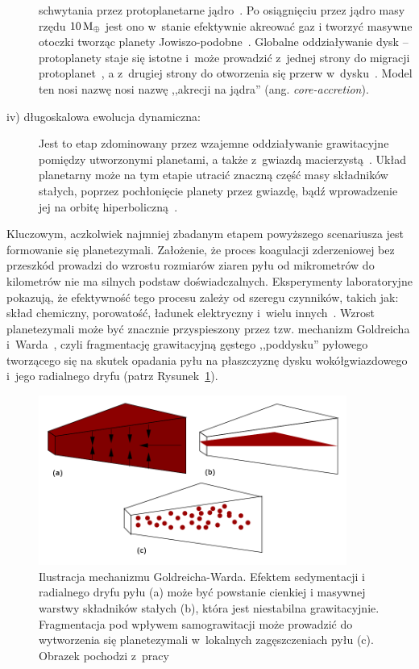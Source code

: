 \begin{description}
   schwytania przez protoplanetarne jądro~\cite{II03}. Po osiągnięciu przez
   jądro masy rzędu $10\hbox{$\mathrm{\thinspace M_{\oplus}}$}$ jest ono w~stanie efektywnie akreować gaz i
   tworzyć masywne otoczki tworząc planety Jowiszo-podobne~\cite{Petal96}.
   Globalne oddziaływanie dysk -- protoplanety staje się istotne i~może
   prowadzić z~jednej strony do migracji protoplanet~\cite{Papa07}, a z~drugiej
   strony do otworzenia się przerw w~dysku~\citep{KKI06}. Model ten nosi nazwę
   nosi nazwę ,,akrecji na jądra'' (ang. \emph{core-accretion}). 
%
\item[iv) długoskalowa ewolucja dynamiczna:]
   Jest to etap zdominowany przez wzajemne oddziaływanie
   grawitacyjne pomiędzy utworzonymi planetami, a także z~gwiazdą
   macierzystą~\cite{CW98}.  Układ planetarny może na tym etapie utracić
   znaczną część masy składników stałych, poprzez pochłonięcie planety przez
   gwiazdę, bądź wprowadzenie jej na orbitę hiperboliczną~\cite{DAA13}.
%
\end{description}
Kluczowym, aczkolwiek najmniej zbadanym etapem powyższego scenariusza jest
formowanie się planetezymali. Założenie, że proces koagulacji zderzeniowej bez
przeszkód prowadzi do wzrostu rozmiarów ziaren pyłu od mikrometrów do kilometrów
nie ma silnych podstaw doświadczalnych. Eksperymenty laboratoryjne pokazują, że
efektywność tego procesu zależy od szeregu czynników, takich jak: skład
chemiczny, porowatość, ładunek elektryczny i~wielu innych~\cite{SBT97, GBZ10}.
Wzrost planetezymali może być znacznie przyspieszony przez tzw. mechanizm
Goldreicha i~Warda~\cite{GW73}, czyli fragmentację grawitacyjną gęstego
,,poddysku'' pyłowego tworzącego się na skutek opadania pyłu na płaszczyznę
dysku wokółgwiazdowego i~jego radialnego dryfu (patrz Rysunek~\ref{fig:GW}).

\begin{figure}[h]
   \centering
   \includegraphics[width=0.9\textwidth]{figures/sedymentacja.png}
   \caption[Mechanizm Goldreicha-Warda.]
      {Ilustracja mechanizmu Goldreicha-Warda. Efektem sedymentacji i
      radialnego dryfu pyłu (a) może być powstanie cienkiej i masywnej warstwy
      składników stałych (b), która jest niestabilna grawitacyjnie.
      Fragmentacja pod wpływem samograwitacji może
      prowadzić do wytworzenia się planetezymali w~lokalnych zagęszczeniach pyłu
      (c). Obrazek pochodzi z~pracy~\cite{armitage}
   }
   \label{fig:GW}
\end{figure}

